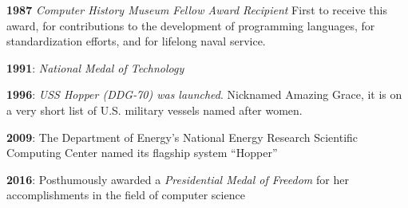 \documentclass[10pt,]{article}
\begin{document}
\textbf{1987} \emph{Computer History Museum Fellow Award Recipient}
First to receive this award, for contributions to the development of
programming languages, for standardization efforts, and for lifelong
naval service.

\textbf{1991}: \emph{National Medal of Technology}

\textbf{1996}: \emph{USS Hopper (DDG-70) was launched}. Nicknamed
Amazing Grace, it is on a very short list of U.S. military vessels named
after women.

\textbf{2009}: The Department of Energy's National Energy Research
Scientific Computing Center named its flagship system ``Hopper''

\textbf{2016}: Posthumously awarded a \emph{Presidential Medal of
Freedom} for her accomplishments in the field of computer science
\end{document}
